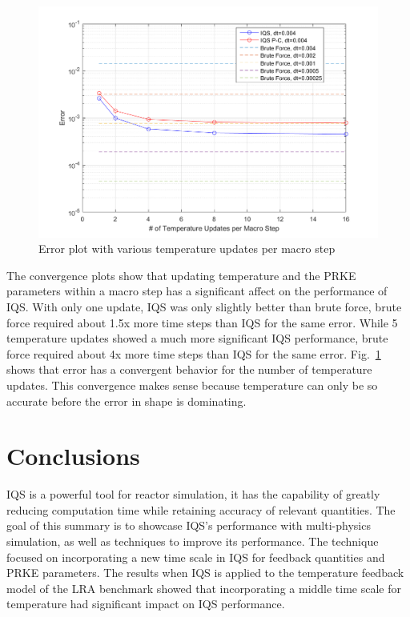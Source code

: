 \documentclass{anstrans}
\newcommand{\fig}[1]{Fig.~\ref{#1}}                      %
\begin{document}
\begin{figure}[htbp!]
\centering
\includegraphics[width=\linewidth]{lra_mp.png}
\caption{Error plot with various temperature updates per macro step}
\label{fig:mp}
\end{figure}

The convergence plots show that updating temperature and the PRKE parameters within a macro step has a significant affect on the performance of IQS.  With only one update, IQS was only slightly better than brute force, brute force required about 1.5x more time steps than IQS for the same error.  While 5 temperature updates showed a much more significant IQS performance, brute force required about 4x more time steps than IQS for the same error.  \fig{fig:mp} shows that error has a convergent behavior for the number of temperature updates.  This convergence makes sense because temperature can only be so accurate before the error in shape is dominating.

\section{Conclusions}

IQS is a powerful tool for reactor simulation, it has the capability of greatly reducing computation time while retaining accuracy of relevant quantities.  The goal of this summary is to showcase IQS's performance with multi-physics simulation, as well as techniques to improve its performance.  The technique focused on incorporating a new time scale in IQS for feedback quantities and PRKE parameters.  The results when IQS is applied to the temperature feedback model of the LRA benchmark showed that incorporating a middle time scale for temperature had significant impact on IQS performance.
\end{document}
